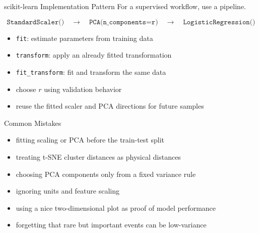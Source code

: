 \documentclass[aspectratio=169]{beamer}
\begin{document}
\begin{frame}{scikit-learn Implementation Pattern}
\small
For a supervised workflow, use a pipeline.

\vspace{0.5em}
\begin{equation*}
\texttt{StandardScaler()}
\quad\rightarrow\quad
\texttt{PCA(n\_components=r)}
\quad\rightarrow\quad
\texttt{LogisticRegression()}
\end{equation*}

\vspace{0.5em}
\begin{itemize}
\item \texttt{fit}: estimate parameters from training data
\item \texttt{transform}: apply an already fitted transformation
\item \texttt{fit\_transform}: fit and transform the same data
\item choose $r$ using validation behavior
\item reuse the fitted scaler and PCA directions for future samples
\end{itemize}
\end{frame}

\begin{frame}{Common Mistakes}
\small
\begin{itemize}
\item fitting scaling or PCA before the train-test split
\item treating t-SNE cluster distances as physical distances
\item choosing PCA components only from a fixed variance rule
\item ignoring units and feature scaling
\item using a nice two-dimensional plot as proof of model performance
\item forgetting that rare but important events can be low-variance
\end{itemize}
\end{frame}
\end{document}
